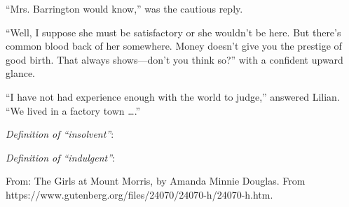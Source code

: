 \begin{enumerate}
\begin{linenumbers}
``Mrs. Barrington would know,'' was the cautious reply.

``Well, I suppose she must be satisfactory or she wouldn’t be here. But there’s common blood back of her somewhere. Money doesn’t give you the prestige of good birth. That always shows—don’t you think so?'' with a confident upward glance.

``I have not had experience enough with the world to judge,'' answered Lilian. ``We lived in a factory town \ldots.''

\end{linenumbers}

\textit{Definition of ``insolvent''}: \hrulefill

\hrulefill

\textit{Definition of ``indulgent''}: \hrulefill

\hrulefill

From: The Girls at Mount Morris, by Amanda Minnie Douglas. From \sloppy https://www.gutenberg.org/files/24070/24070-h/24070-h.htm.
\end{enumerate}











